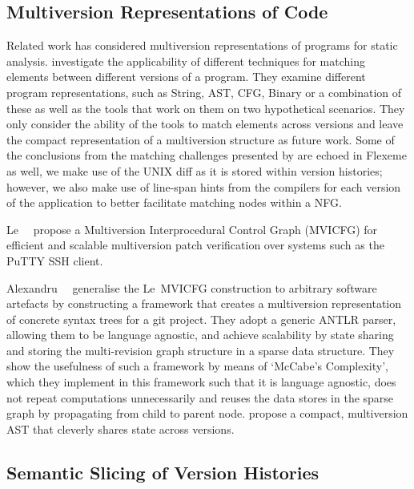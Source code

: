 
\subsection{Multiversion Representations of Code}
\label{chapter:literature:sec:flexeme_rel_work:multiversion_repr}

Related work has considered multiversion representations of programs for static
analysis. \citet{kim2006program} investigate the applicability of different
techniques for matching elements between different versions of a program. They
examine different program representations, such as String, AST, CFG, Binary or a
combination of these as well as the tools that work on them on two hypothetical
scenarios. They only consider the ability of the tools to match elements across
versions and leave the compact representation of a multiversion structure as
future work. Some of the conclusions from the matching challenges presented by
\citet{kim2006program} are echoed in Flexeme as well, we make use of the UNIX
diff as it is stored within version histories; however, we also make use of
line-span hints from the compilers for each version of the application to better
facilitate matching nodes within a NFG.

Le~\etal~\cite{Le2014} propose a Multiversion Interprocedural Control Graph
(MVICFG) for efficient and scalable multiversion patch verification over systems
such as the PuTTY SSH client.

Alexandru~\etal~\citep{alexandru2019redundancy} generalise the Le~\etal MVICFG
construction to arbitrary software artefacts by constructing a framework that
creates a multiversion representation of concrete syntax trees for a git
project. They adopt a generic ANTLR parser, allowing them to be language
agnostic, and achieve scalability by state sharing and storing the
multi-revision graph structure in a sparse data structure. They show the
usefulness of such a framework by means of `McCabe’s Complexity', which they
implement in this framework such that it is language agnostic, does not repeat
computations unnecessarily and reuses the data stores in the sparse graph by
propagating from child to parent node. \citet{Sebastian2018} propose a compact,
multiversion AST that cleverly shares state across versions.


\subsection{Semantic Slicing of Version Histories}
\label{chapter:literature:sec:flexeme_rel_work:sem_slice_vh}

